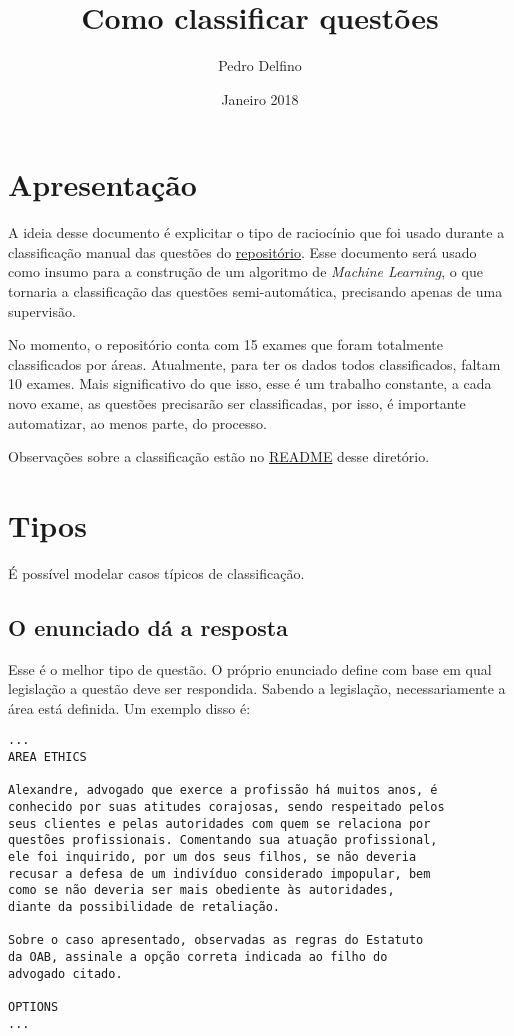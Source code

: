 \documentclass{article}
\title{Como classificar questões}
\author{Pedro Delfino}
\date{Janeiro 2018}
\begin{document}
\maketitle

\section{Apresentação}

A ideia desse documento é explicitar o tipo de raciocínio que foi
usado durante a classificação manual das questões do
\href{https://github.com/own-pt/oab-exams/tree/master/official/raw}{repositório}. Esse
documento será usado como insumo para a construção de um algoritmo de
\textit{Machine Learning}, o que tornaria a classificação das questões
semi-automática, precisando apenas de uma supervisão.

No momento, o repositório conta com 15 exames que foram totalmente
classificados por áreas. Atualmente, para ter os dados todos
classificados, faltam 10 exames. Mais significativo do que isso, esse
é um trabalho constante, a cada novo exame, as questões precisarão ser
classificadas, por isso, é importante automatizar, ao menos parte, do
processo.

Observações sobre a classificação estão no
\href{https://github.com/own-pt/oab-exams/blob/master/official/raw/README.org}{
  README} desse diretório.

\section{Tipos}

É possível modelar casos típicos de classificação.

\subsection{O enunciado dá a resposta}

Esse é o melhor tipo de questão. O próprio enunciado define com base
em qual legislação a questão deve ser respondida. Sabendo a
legislação, necessariamente a área está definida. Um exemplo disso é:

\begin{verbatim}
...
AREA ETHICS

Alexandre, advogado que exerce a profissão há muitos anos, é 
conhecido por suas atitudes corajosas, sendo respeitado pelos 
seus clientes e pelas autoridades com quem se relaciona por 
questões profissionais. Comentando sua atuação profissional, 
ele foi inquirido, por um dos seus filhos, se não deveria 
recusar a defesa de um indivíduo considerado impopular, bem 
como se não deveria ser mais obediente às autoridades, 
diante da possibilidade de retaliação. 
 
Sobre o caso apresentado, observadas as regras do Estatuto 
da OAB, assinale a opção correta indicada ao filho do 
advogado citado. 
 
OPTIONS
...
\end{verbatim}
\end{document}
